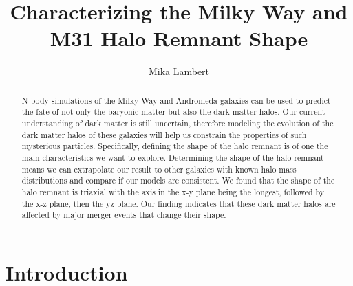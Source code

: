 \documentclass[linenumbers, twocolumn]{aastex631}
\begin{document}
\title{Characterizing the Milky Way and M31 Halo Remnant Shape}



\author[0000-0002-2527-8899]{Mika Lambert}

\received{\today}

\begin{abstract}

N-body simulations of the Milky Way and Andromeda galaxies can be used to predict the fate of not only the baryonic matter but also the dark matter halos. 
Our current understanding of dark matter is still uncertain, therefore modeling the evolution of the dark matter halos of these galaxies will help us constrain the properties of such mysterious particles. 
Specifically, defining the shape of the halo remnant is of one the main characteristics we want to explore. 
Determining the shape of the halo remnant means we can extrapolate our result to other galaxies with known halo mass distributions and compare if our models are consistent.
We found that the shape of the halo remnant is triaxial with the axis in the x-y plane being the longest, followed by the x-z plane, then the yz plane. Our finding indicates that these dark matter halos are affected by major merger events that change their shape.

\end{abstract}



\section{Introduction} \label{sec:intro}
\end{document}
